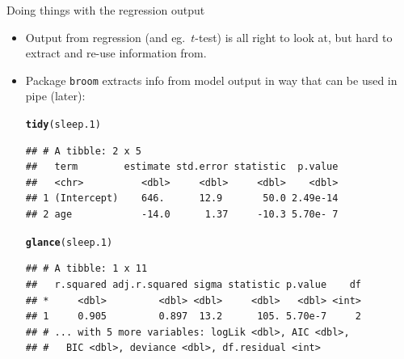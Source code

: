 \documentclass[unknownkeysallowed]{beamer}\usepackage[]{graphicx}\usepackage[]{color}
\makeatletter
\newcommand{\hlstd}[1]{\textcolor[rgb]{0.345,0.345,0.345}{#1}}%
\newcommand{\hlkwd}[1]{\textcolor[rgb]{0.737,0.353,0.396}{\textbf{#1}}}%
\newenvironment{kframe}{%
 \def\at@end@of@kframe{}%
 \ifinner\ifhmode%
  \def\at@end@of@kframe{\end{minipage}}%
  \begin{minipage}{\columnwidth}%
 \fi\fi%
 \def\FrameCommand##1{\hskip\@totalleftmargin \hskip-\fboxsep
 \colorbox{shadecolor}{##1}\hskip-\fboxsep
     \hskip-\linewidth \hskip-\@totalleftmargin \hskip\columnwidth}%
 \MakeFramed {\advance\hsize-\width
   \@totalleftmargin\z@ \linewidth\hsize
   \@setminipage}}%
 {\par\unskip\endMakeFramed%
 \at@end@of@kframe}
\newenvironment{knitrout}{}{} %
\makeatother
\begin{document}
\begin{frame}[fragile]{Doing things with the regression output}
  
  \begin{itemize}
  \item Output from regression (and eg.\ $t$-test) is all right to
    look at, but hard to extract and re-use information from.
  \item Package \texttt{broom} extracts info from model output in way
    that can be used in pipe (later):
    
\begin{knitrout}\footnotesize
{}\color{fgcolor}\begin{kframe}
\begin{alltt}
\hlkwd{tidy}\hlstd{(sleep.1)}
\end{alltt}
\begin{verbatim}
## # A tibble: 2 x 5
##   term        estimate std.error statistic  p.value
##   <chr>          <dbl>     <dbl>     <dbl>    <dbl>
## 1 (Intercept)    646.      12.9       50.0 2.49e-14
## 2 age            -14.0      1.37     -10.3 5.70e- 7
\end{verbatim}
\begin{alltt}
\hlkwd{glance}\hlstd{(sleep.1)}
\end{alltt}
\begin{verbatim}
## # A tibble: 1 x 11
##   r.squared adj.r.squared sigma statistic p.value    df
## *     <dbl>         <dbl> <dbl>     <dbl>   <dbl> <int>
## 1     0.905         0.897  13.2      105. 5.70e-7     2
## # ... with 5 more variables: logLik <dbl>, AIC <dbl>,
## #   BIC <dbl>, deviance <dbl>, df.residual <int>
\end{verbatim}
\end{kframe}
\end{knitrout}
  \end{itemize}
  
\end{frame}
\end{document}
